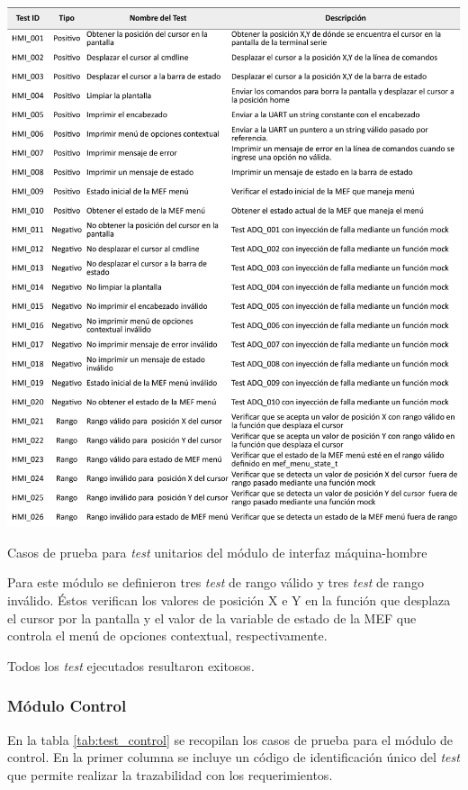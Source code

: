 \begin{table}[htpb]
	\centering
	\includegraphics[width=\textwidth]{./Figures/TestHMI.pdf}
	\caption{Casos de prueba para \textit{test} unitarios del módulo de interfaz máquina-hombre}
	\label{tab:test_interfaz}
\end{table}

Para este módulo se definieron tres \textit{test} de rango válido y tres \textit{test} de rango inválido. Éstos verifican los valores de posición X e Y en la función que desplaza el cursor por la pantalla y el valor de la variable de estado de la MEF que controla el menú de opciones contextual, respectivamente.

Todos los \textit{test} ejecutados resultaron exitosos.

\subsubsection{Módulo Control}

En la tabla \ref{tab:test_control} se recopilan los casos de prueba para el módulo de control.  En la primer columna se incluye un código de identificación único del \textit{test} que permite realizar la trazabilidad con los requerimientos. %

